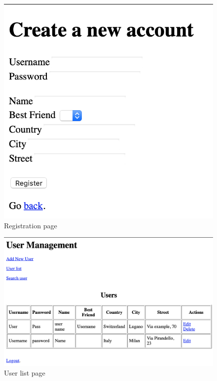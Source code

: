 \documentclass[a4paper]{report}
\begin{document}
	\begin{figure}[ht]
		\centering
		\includegraphics[scale=0.7]{images/registration.png}
		\caption{Registration page}
		\label{fig:registration}
	\end{figure}
	
	\begin{figure}[ht]
		\centering
		\includegraphics[scale=0.6]{images/userlist.png}
		\caption{User list page}
		\label{fig:user_list}
	\end{figure} 
	
\end{document}
